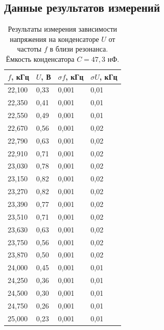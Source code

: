 \documentclass[12pt]{article}
\begin{document}
\subsection{Данные результатов измерений} \label{app_3}
\begin{table}[H]
    \centering
    \begin{tabular}{|l|l|l|l|}
        \hline
        $f$, кГц & $U$, В & $\sigma f$, кГц & $\sigma U$, кГц \\ \hline
        22,100   & 0,33   & 0,001           & 0,01            \\ \hline
        22,350   & 0,41   & 0,001           & 0,01            \\ \hline
        22,550   & 0,49   & 0,001           & 0,01            \\ \hline
        22,670   & 0,56   & 0,001           & 0,02            \\ \hline
        22,790   & 0,63   & 0,001           & 0,02            \\ \hline
        22,910   & 0,71   & 0,001           & 0,02            \\ \hline
        23,030   & 0,78   & 0,001           & 0,02            \\ \hline
        23,150   & 0,82   & 0,001           & 0,02            \\ \hline
        23,270   & 0,82   & 0,001           & 0,02            \\ \hline
        23,390   & 0,77   & 0,001           & 0,02            \\ \hline
        23,510   & 0,71   & 0,001           & 0,02            \\ \hline
        23,630   & 0,63   & 0,001           & 0,02            \\ \hline
        23,750   & 0,56   & 0,001           & 0,02            \\ \hline
        23,870   & 0,50   & 0,001           & 0,02            \\ \hline
        24,000   & 0,45   & 0,001           & 0,01            \\ \hline
        24,250   & 0,36   & 0,001           & 0,01            \\ \hline
        24,500   & 0,30   & 0,001           & 0,01            \\ \hline
        24,750   & 0,26   & 0,001           & 0,01            \\ \hline
        25,000   & 0,23   & 0,001           & 0,01            \\ \hline
    \end{tabular}
    \caption{Результаты измерения зависимости напряжения на конденсаторе $U$ от частоты $f$ в близи резонанса.
        Ёмкость конденсатора $C = 47,3$ нФ.}
    \label{tab:2}
\end{table}
\end{document}
